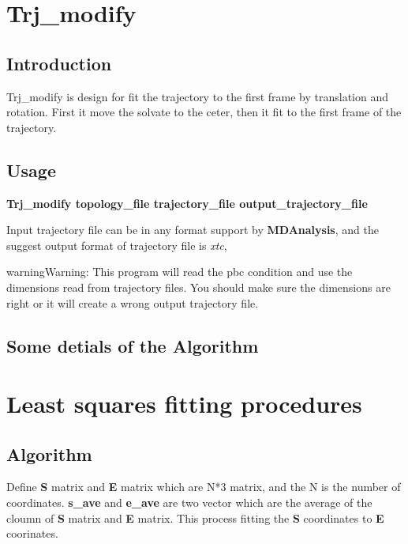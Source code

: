 \documentclass[letterpaper,10pt,english]{sphinxmanual}
\begin{document}
\chapter{Trj\_modify}
\label{documentation_pages/Trj_modify::doc}\label{documentation_pages/Trj_modify:trj-modify}

\section{Introduction}
\label{documentation_pages/Trj_modify:introduction}
Trj\_modify is design for fit the trajectory to the first frame by translation and rotation. First it move the solvate to the ceter, then it fit to the first frame of the trajectory.


\section{Usage}
\label{documentation_pages/Trj_modify:usage}
\textbf{Trj\_modify topology\_file  trajectory\_file  output\_trajectory\_file}

Input trajectory file can be in any format support by \textbf{MDAnalysis}, and the suggest output format of trajectory file is \emph{xtc},

\begin{notice}{warning}{Warning:}
This program will read the pbc condition and use the dimensions read from trajectory files. You should make sure the dimensions are right or it will create a wrong output trajectory file.
\end{notice}


\section{Some detials of the Algorithm}
\label{documentation_pages/Trj_modify:some-detials-of-the-algorithm}

\chapter{Least squares fitting procedures}
\label{documentation_pages/least_squares_fitting::doc}\label{documentation_pages/least_squares_fitting:least-squares-fitting-procedures}

\section{Algorithm}
\label{documentation_pages/least_squares_fitting:algorithm}
Define \textbf{S} matrix and \textbf{E} matrix which are N*3 matrix, and the N is the number of coordinates.
\textbf{s\_ave} and \textbf{e\_ave} are two vector which are the average of the cloumn of \textbf{S} matrix and \textbf{E} matrix. This process fitting the \textbf{S} coordinates to \textbf{E} coorinates.
\end{document}
